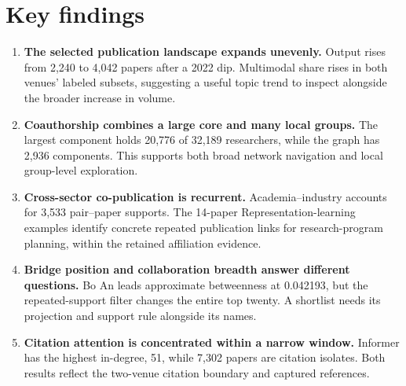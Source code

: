 \section{Key findings}
\begin{enumerate}
\item \textbf{The selected publication landscape expands unevenly.} Output
rises from 2,240 to 4,042 papers after a 2022 dip. Multimodal share rises in both
venues' labeled subsets, suggesting a useful topic trend to inspect alongside
the broader increase in volume.
\item \textbf{Coauthorship combines a large core and many local groups.}
The largest component holds 20,776 of 32,189 researchers, while the graph has
2,936 components. This supports both broad network navigation and local
group-level exploration.
\item \textbf{Cross-sector co-publication is recurrent.} Academia--industry
accounts for 3,533 pair--paper supports. The 14-paper Representation-learning
examples identify concrete repeated publication links for research-program
planning, within the retained affiliation evidence.
\item \textbf{Bridge position and collaboration breadth answer different
questions.} Bo An leads approximate betweenness at 0.042193, but the repeated-support
filter changes the entire top twenty. A shortlist needs its projection and
support rule alongside its names.
\item \textbf{Citation attention is concentrated within a narrow window.}
Informer has the highest in-degree, 51, while 7,302 papers are citation isolates.
Both results reflect the two-venue citation boundary and captured references.
\end{enumerate}
